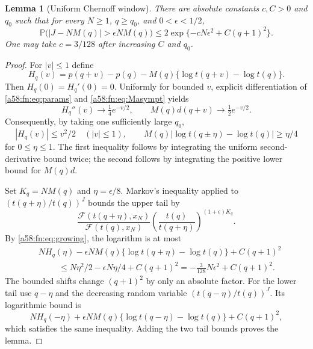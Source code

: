 \documentclass[11pt,letterpaper]{article}
\newtheorem{lemma}[theorem]{Lemma}
\theoremstyle{remark}
\newcommand{\FF}{\mathcal F}
\newcommand{\Prb}{\mathbb P}
\begin{document}
\begin{lemma}[Uniform Chernoff window]\label{a58:fn:lem:chernoff}
There are absolute constants $c,C>0$ and $q_0$ such that for every $N\ge1$, $q\ge q_0$, and $0<\epsilon<1/2$,
\begin{equation}\label{a58:fn:eq:chernoff}
 \Prb\bigl(|J-NM(q)|>\epsilon NM(q)\bigr)
 \le2\exp\{-cN\epsilon^2+C(q+1)^2\}.
\end{equation}
One may take $c=3/128$ after increasing $C$ and $q_0$.
\end{lemma}
\begin{proof}
For $|v|\le1$ define
\[
 H_q(v)=p(q+v)-p(q)-M(q)\{\log t(q+v)-\log t(q)\}.
\]
Then $H_q(0)=H_q'(0)=0$. Uniformly for bounded $v$, explicit differentiation of \eqref{a58:fn:eq:params} and \eqref{a58:fn:eq:Masympt} yields
\[
 H_q''(v)\longrightarrow\tfrac14e^{-v/2},\qquad
 M(q)d(q+v)\longrightarrow\tfrac12e^{-v/2}.
\]
Consequently, by taking one sufficiently large $q_0$,
\begin{equation}\label{a58:fn:eq:calculus}
 |H_q(v)|\le v^2/2\quad(|v|\le1),\qquad
 M(q)|\log t(q\pm\eta)-\log t(q)|\ge\eta/4
\end{equation}
for $0\le\eta\le1$. The first inequality follows by integrating the uniform second-derivative bound twice; the second follows by integrating the positive lower bound for $M(q)d$.

Set $K_q=NM(q)$ and $\eta=\epsilon/8$. Markov's inequality applied to $(t(q+\eta)/t(q))^J$ bounds the upper tail by
\[
 \frac{\FF(t(q+\eta),x_N)}{\FF(t(q),x_N)}
 \left(\frac{t(q)}{t(q+\eta)}\right)^{(1+\epsilon)K_q}.
\]
By \eqref{a58:fn:eq:growing}, the logarithm is at most
\begin{align*}
 &NH_q(\eta)-\epsilon NM(q)\{\log t(q+\eta)-\log t(q)\}
     +C(q+1)^2\\
 &\hspace{1cm}\le N\eta^2/2-\epsilon N\eta/4+C(q+1)^2
 =-\frac3{128}N\epsilon^2+C(q+1)^2.
\end{align*}
The bounded shifts change $(q+1)^2$ by only an absolute factor. For the lower tail use $q-\eta$ and the decreasing random variable $(t(q-\eta)/t(q))^J$. Its logarithmic bound is
\[
 NH_q(-\eta)+\epsilon NM(q)\{\log t(q-\eta)-\log t(q)\}
 +C(q+1)^2,
\]
which satisfies the same inequality. Adding the two tail bounds proves the lemma.
\end{proof}
\end{document}
